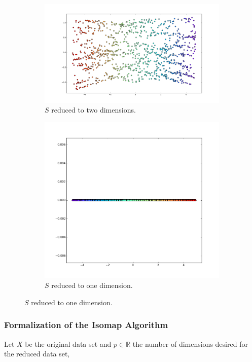 \documentclass[12pt]{article}
\begin{document}
\begin{figure}[H]
    \begin{subfigure}{.5\linewidth}
		\centering
		\captionsetup{justification=centering}
		\includegraphics[width=\linewidth]{mani_s_4}
		\caption{$S$ reduced to two dimensions.}
		\label{fig:mani_s_reduced_1}
	\end{subfigure}%
	\begin{subfigure}{.5\linewidth}
		\centering
		\captionsetup{justification=centering}
		\includegraphics[width=.63\linewidth]{mani_s_5}
		\caption{$S$ reduced to one dimension.}
		\label{fig:mani_s_reduced_2}
	\end{subfigure}
\end{figure}

\subsubsection{Formalization of the Isomap Algorithm}

Let $X$ be the original data set and $p \in \mathbb{R}$ the number of dimensions desired for the reduced data set, \cite{ten2000}
\end{document}
